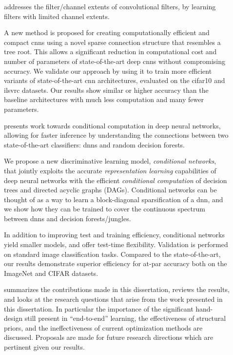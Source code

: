 \documentclass[thesis]{subfiles}
\begin{document}
\begin{description}
	\item[] addresses the filter/channel extents of convolutional filters, by learning filters with limited channel extents. 
	
	A new method is proposed for creating computationally efficient and compact \glspl{cnn} using a novel sparse connection structure that resembles a tree root. This allows a significant reduction in computational cost and number of parameters of state-of-the-art deep \glspl{cnn} without compromising accuracy. We validate our approach by using it to train more efficient variants of state-of-the-art \gls{cnn} architectures, evaluated on the \gls{cifar10} and \gls{ilsvrc} datasets. Our results show similar or higher accuracy than the baseline architectures with much less computation and many fewer parameters. %
	
	\item[] presents work towards conditional computation in deep neural networks, allowing for faster inference by understanding the connections between two state-of-the-art classifiers: \glspl{dnn} and random decision forests.
	
	We propose a new discriminative learning model, \emph{conditional networks}, 
	that jointly exploits the accurate \emph{representation learning} capabilities of deep neural networks with the efficient \emph{conditional computation} of decision trees and directed acyclic graphs (DAGs).
	Conditional networks can be thought of as a way to learn a block-diagonal sparsification of a \gls{dnn}, and we show how they can be trained to cover the continuous spectrum between \glspl{dnn} and decision forests/jungles. 
	
	In addition to improving test and training efficiency, conditional networks yield smaller models, and offer test-time flexibility. Validation is performed on standard image classification tasks. Compared to the state-of-the-art, our results demonstrate superior efficiency for at-par accuracy both on the ImageNet and CIFAR datasets.
	
	\item[] summarizes the contributions made in this dissertation, reviews the results, and looks at the research questions that arise from the work presented in this dissertation. In particular the importance of the significant hand-design still present in ``end-to-end'' learning, the effectiveness of structural priors, and the ineffectiveness of current optimization methods are discussed. Proposals are made for future research directions which are pertinent given our results.
	
\end{description}
\end{document}

